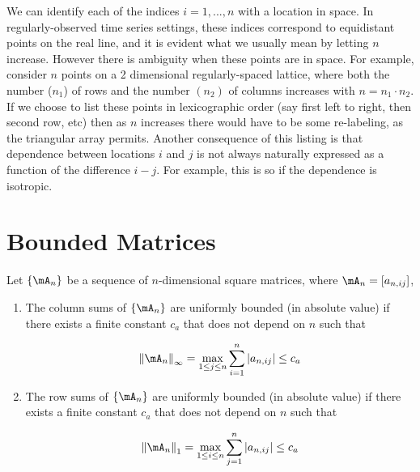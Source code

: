 \documentclass[english,12pt]{book}\usepackage[]{graphicx}\usepackage[]{xcolor}
\begin{document}
We can identify each of the indices $i = 1,...,n$ with a location in space. In regularly-observed time series settings, these indices correspond to equidistant points on the real line, and it is evident what we usually mean by letting $n$ increase. However there is ambiguity when these points are in space. For example, consider $n$ points on a 2 dimensional regularly-spaced lattice, where both the number ($n_1$) of rows and the number $(n_2)$ of columns increases with $n=n_1\cdot n_2$. If we choose to list these points in lexicographic order (say first left to right, then second row, etc) then as $n$ increases there would have to be some re-labeling, as the triangular array permits. Another consequence of this listing is that dependence between locations $i$ and $j$ is not always naturally expressed as a function of the difference $i-j$. For example, this is so if the dependence is isotropic. 


\section{Bounded Matrices}

\begin{definition}\label{def:Bounded_Matrices}
Let $\left\lbrace \mA_n \right\rbrace$ be a sequence of $n$-dimensional square matrices, where $\mA_n = \left[a_{n,ij}\right]$,
  \begin{enumerate}
    \item The column sums of $\left\lbrace \mA_n \right\rbrace$ are uniformly bounded (in absolute value) if there exists a finite constant $c_a$ that does not depend on $n$ such that 
    
    \begin{equation*}
      \left\|\mA_n\right\|_{\infty} = \max_{1 \leq j\leq n}\sum_{i = 1}^n\left|a_{n, ij}\right| \leq c_a
    \end{equation*}
     \item The row sums of $\left\lbrace \mA_n \right\rbrace$ are uniformly bounded (in absolute value) if there exists a finite constant $c_a$ that does not depend on $n$ such that 
    
    \begin{equation*}
      \left\|\mA_n\right\|_1 = \max_{1 \leq i\leq n}\sum_{j = 1}^n\left|a_{n, ij}\right| \leq c_a
    \end{equation*}
  \end{enumerate}
\end{definition}
\end{document}
